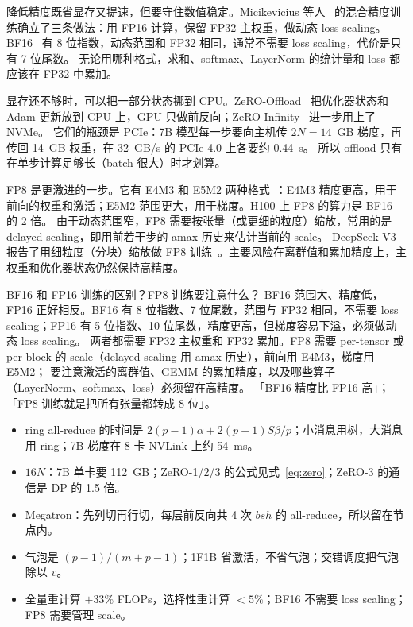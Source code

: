 降低精度既省显存又提速，但要守住数值稳定。Micikevicius 等人~\cite{micikevicius2018mixed} 的混合精度训练确立了三条做法：用 FP16 计算，保留 FP32 主权重，做动态 loss scaling。
BF16~\cite{kalamkar2019study} 有 8 位指数，动态范围和 FP32 相同，通常不需要 loss scaling，代价是只有 7 位尾数。
无论用哪种格式，求和、softmax、LayerNorm 的统计量和 loss 都应该在 FP32 中累加。

显存还不够时，可以把一部分状态挪到 CPU。ZeRO-Offload~\cite{ren2021zero} 把优化器状态和 Adam 更新放到 CPU 上，GPU 只做前反向；ZeRO-Infinity~\cite{rajbhandari2021zero} 进一步用上了 NVMe。
它们的瓶颈是 PCIe：7B 模型每一步要向主机传 $2N=14$~GB 梯度，再传回 14~GB 权重，在 32~GB/s 的 PCIe 4.0 上各要约 0.44~s。
所以 offload 只有在单步计算足够长（batch 很大）时才划算。

FP8 是更激进的一步。它有 E4M3 和 E5M2 两种格式~\cite{micikevicius2022fp8}：E4M3 精度更高，用于前向的权重和激活；E5M2 范围更大，用于梯度。H100 上 FP8 的算力是 BF16 的 2 倍。
由于动态范围窄，FP8 需要按张量（或更细的粒度）缩放，常用的是 delayed scaling，即用前若干步的 amax 历史来估计当前的 scale。
DeepSeek-V3 报告了用细粒度（分块）缩放做 FP8 训练~\cite{deepseekai2024v3}。主要风险在离群值和累加精度上，主权重和优化器状态仍然保持高精度。

\begin{qa}{BF16 和 FP16 训练的区别？FP8 训练要注意什么？}
\ans BF16 范围大、精度低，FP16 正好相反。BF16 有 8 位指数、7 位尾数，范围与 FP32 相同，不需要 loss scaling；FP16 有 5 位指数、10 位尾数，精度更高，但梯度容易下溢，必须做动态 loss scaling。
两者都需要 FP32 主权重和 FP32 累加。FP8 需要 per-tensor 或 per-block 的 scale（delayed scaling 用 amax 历史），前向用 E4M3，梯度用 E5M2；
要注意激活的离群值、GEMM 的累加精度，以及哪些算子（LayerNorm、softmax、loss）必须留在高精度。
\wrong 「BF16 精度比 FP16 高」；「FP8 训练就是把所有张量都转成 8 位」。
\end{qa}

\begin{keypts}
\begin{itemize}
\item ring all-reduce 的时间是 $2(p-1)\alpha+2(p-1)S\beta/p$；小消息用树，大消息用 ring；7B 梯度在 8 卡 NVLink 上约 54~ms。
\item $16N$：7B 单卡要 112~GB；ZeRO-1/2/3 的公式见式~\eqref{eq:zero}；ZeRO-3 的通信是 DP 的 1.5 倍。
\item Megatron：先列切再行切，每层前反向共 4 次 $bsh$ 的 all-reduce，所以留在节点内。
\item 气泡是 $(p-1)/(m+p-1)$；1F1B 省激活，不省气泡；交错调度把气泡除以 $v$。
\item 全量重计算 $+33\%$ FLOPs，选择性重计算 $<5\%$；BF16 不需要 loss scaling；FP8 需要管理 scale。
\end{itemize}
\end{keypts}

